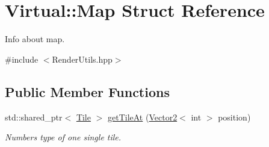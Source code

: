 \hypertarget{struct_virtual_1_1_map}{}\section{Virtual\+:\+:Map Struct Reference}
\label{struct_virtual_1_1_map}


Info about map.  




{\ttfamily \#include $<$Render\+Utils.\+hpp$>$}

\subsection*{Public Member Functions}
\begin{DoxyCompactItemize}
\item 
std\+::shared\+\_\+ptr$<$ \hyperlink{class_virtual_1_1_tile}{Tile} $>$ \hyperlink{struct_virtual_1_1_map_ae92e86e0da301c4481718bc871086013}{get\+Tile\+At} (\hyperlink{struct_virtual_1_1_vector2}{Vector2}$<$ int $>$ position)
\begin{DoxyCompactList}\small\item\em Numbers type of one single tile. \end{DoxyCompactList}\end{DoxyCompactItemize}
